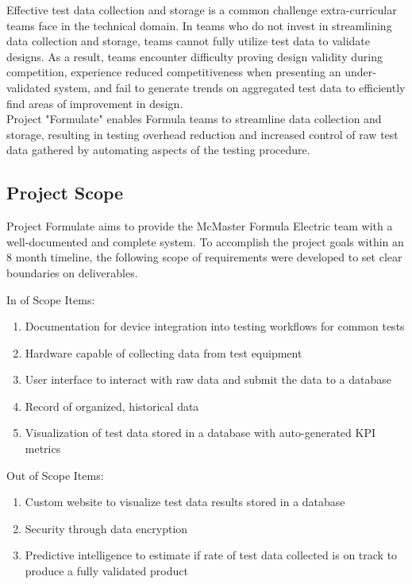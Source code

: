 \documentclass[12pt]{article}
\begin{document}
Effective test data collection and storage is a common challenge extra-curricular teams face in the technical domain. In teams who do not invest in streamlining data collection and storage, teams cannot fully utilize test data to validate designs. As a result, teams encounter difficulty proving design validity during competition, experience reduced competitiveness when presenting an under-validated system, and fail to generate trends on aggregated test data to efficiently find areas of improvement in design. \\

Project "Formulate" enables Formula teams to streamline data collection and storage, resulting in testing overhead reduction and increased control of raw test data gathered by automating aspects of the testing procedure.\\

\subsection{Project Scope}

Project Formulate aims to provide the McMaster Formula Electric team with a well-documented and complete system. To accomplish the project goals within an 8 month timeline, the following scope of requirements were developed to set clear boundaries on deliverables.\\

\newpage

\noindent
  In of Scope Items:
  \begin{enumerate}
\item Documentation for device integration into testing workflows for common tests
\item Hardware capable of collecting data from test equipment
\item User interface to interact with raw data and submit the data to a database
\item Record of organized, historical data
\item Visualization of test data stored in a database with auto-generated KPI metrics
  \end{enumerate}
  Out of Scope Items:

  \begin{enumerate}
\item Custom website to visualize test data results stored in a database
\item Security through data encryption
\item Predictive intelligence to estimate if rate of test data collected is on track to produce a fully validated product
  \end{enumerate}
\end{document}
